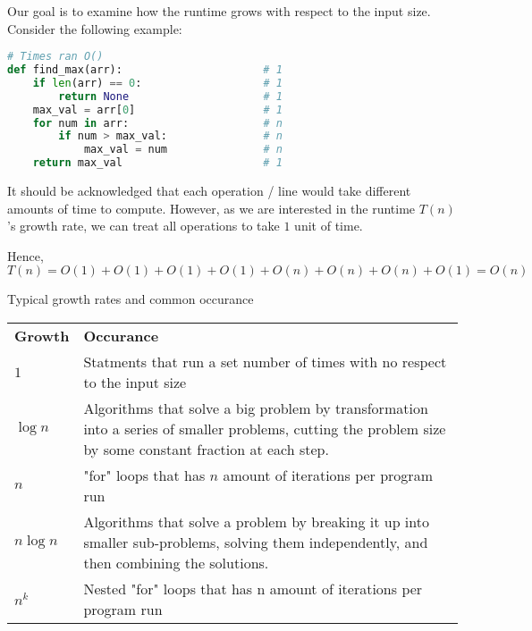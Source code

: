 Our goal is to examine how the runtime grows with respect to the input size. Consider the following example:

\begin{lstlisting}[language=Python]
                                        # Times ran O()
def find_max(arr):                      # 1
    if len(arr) == 0:                   # 1
        return None                     # 1
    max_val = arr[0]                    # 1
    for num in arr:                     # n
        if num > max_val:               # n
            max_val = num               # n
    return max_val                      # 1
\end{lstlisting}

It should be acknowledged that each operation / line would take different amounts of time to compute. However, as we are interested in the runtime $T(n)$'s growth rate, we can treat all operations to take $1$ unit of time.

Hence, $T(n)=O(1)+O(1)+O(1)+O(1)+O(n)+O(n)+O(n)+O(1)=O(n)$

\begin{theorem}
    {Typical growth rates and common occurance}
    \begin{tabular}{|l|p{}|}
        \hline
        \textbf{Growth} & \textbf{Occurance}                                                                                                                                        \\
        $1$             & Statments that run a set number of times with no respect to the input size                                                                                \\
        \hline
        $\log n$        & Algorithms that solve a big problem by transformation into a series of smaller problems, cutting the problem size by some constant fraction at each step. \\
        \hline
        $n$             & "for" loops that has $n$ amount of iterations per program run                                                                                             \\
        \hline
        $n\log n$       & Algorithms that solve a problem by breaking it up into smaller sub-problems, solving them independently, and then combining the solutions.                \\
        \hline
        $n^k$           & Nested "for" loops that has n amount of iterations per program run                                                                                        \\
        \hline
    \end{tabular}
\end{theorem}